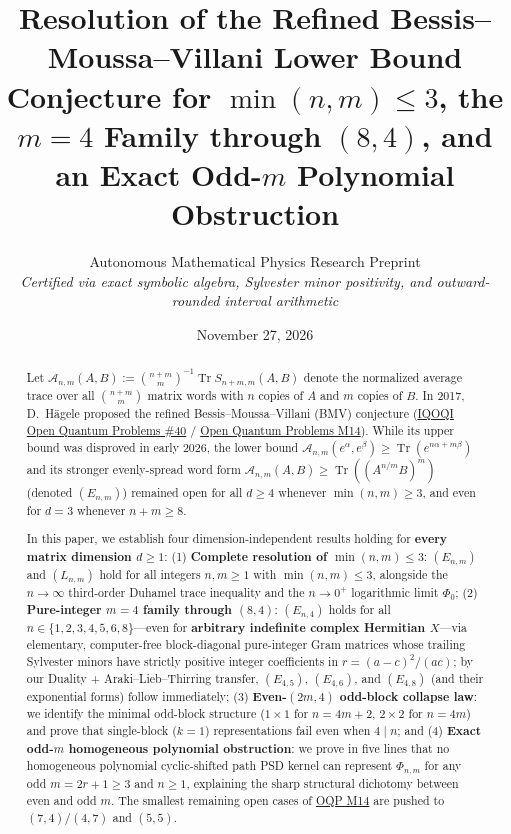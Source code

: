 \documentclass[11pt,a4paper]{article}
\title{\textbf{\color{primary}Resolution of the Refined Bessis--Moussa--Villani Lower Bound Conjecture for $\min(n,m)\le 3$, the $m=4$ Family through $(8,4)$, and an Exact Odd-$m$ Polynomial Obstruction}}
\author{Autonomous Mathematical Physics Research Preprint\\
\small\textit{Certified via exact symbolic algebra, Sylvester minor positivity, and outward-rounded interval arithmetic}}
\date{November 27, 2026}
\theoremstyle{remark}
\newcommand{\Tr}{\operatorname{Tr}}
\begin{document}
\maketitle

\begin{abstract}
Let $\mathcal{A}_{n,m}(A,B) := \binom{n+m}{m}^{-1}\Tr S_{n+m,m}(A,B)$ denote the normalized average trace over all $\binom{n+m}{m}$ matrix words with $n$ copies of $A$ and $m$ copies of $B$. In 2017, D.~H\"agele proposed the refined Bessis--Moussa--Villani (BMV) conjecture (\href{https://oqp.iqoqi.oeaw.ac.at/open-quantum-problems}{IQOQI Open Quantum Problems \#40} / \href{https://openquantumproblems.com/p/M14}{Open Quantum Problems M14}). While its upper bound was disproved in early 2026, the lower bound $\mathcal{A}_{n,m}(e^\alpha,e^\beta)\ge\Tr(e^{n\alpha+m\beta})$ and its stronger evenly-spread word form $\mathcal{A}_{n,m}(A,B)\ge\Tr((A^{n/m}B)^m)$ (denoted $(E_{n,m})$) remained open for all $d\ge 4$ whenever $\min(n,m)\ge 3$, and even for $d=3$ whenever $n+m\ge 8$.

In this paper, we establish four dimension-independent results holding for \textbf{every matrix dimension $d\ge 1$}:
(1) \textbf{Complete resolution of $\min(n,m)\le 3$}: $(E_{n,m})$ and $(L_{n,m})$ hold for all integers $n,m\ge 1$ with $\min(n,m)\le 3$, alongside the $n\to\infty$ third-order Duhamel trace inequality and the $n\to 0^+$ logarithmic limit $\Phi_0$;
(2) \textbf{Pure-integer $m=4$ family through $(8,4)$}: $(E_{n,4})$ holds for all $n\in\{1,2,3,4,5,6,8\}$---even for \textbf{arbitrary indefinite complex Hermitian $X$}---via elementary, computer-free block-diagonal pure-integer Gram matrices whose trailing Sylvester minors have strictly positive integer coefficients in $r=(a-c)^2/(ac)$; by our Duality + Araki--Lieb--Thirring transfer, $(E_{4,5})$, $(E_{4,6})$, and $(E_{4,8})$ (and their exponential forms) follow immediately;
(3) \textbf{Even-$(2m,4)$ odd-block collapse law}: we identify the minimal odd-block structure ($1\times 1$ for $n=4m+2$, $2\times 2$ for $n=4m$) and prove that single-block ($k=1$) representations fail even when $4\mid n$; and
(4) \textbf{Exact odd-$m$ homogeneous polynomial obstruction}: we prove in five lines that no homogeneous polynomial cyclic-shifted path PSD kernel can represent $\Phi_{n,m}$ for any odd $m=2r+1\ge 3$ and $n\ge 1$, explaining the sharp structural dichotomy between even and odd $m$.
The smallest remaining open cases of \href{https://openquantumproblems.com/p/M14}{OQP M14} are pushed to $(7,4)/(4,7)$ and $(5,5)$.
\end{abstract}
\end{document}
